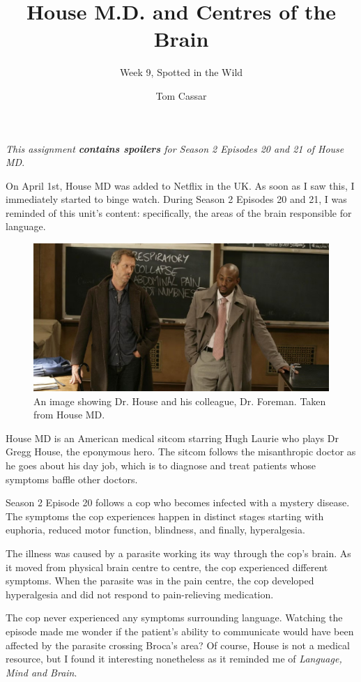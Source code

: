 \documentclass[fontsize=12]{article}
\title{House M.D. and Centres of the Brain}
\author{Week 9, Spotted in the Wild}
\date{Tom Cassar}
\begin{document}
\maketitle

\textit{This assignment \textbf{contains spoilers} for Season 2 Episodes 20 and 21 of 
House MD}. \linebreak


On April 1st, House MD was added to Netflix in the UK. As soon as I saw
this, I immediately started to binge watch. During Season 2
Episodes 20 and 21, I was reminded of this unit's content: specifically,
the areas of the brain responsible for language. \newline

\begin{figure}[H]
    \centering
    \includegraphics[width=0.8 \linewidth]{./img/house-foreman.png} 
    \caption{An image showing Dr. House and his colleague, Dr. Foreman. Taken
    from House MD.}
\end{figure}

House MD is an American medical sitcom starring Hugh Laurie who plays Dr
Gregg House, the eponymous hero. The sitcom follows the misanthropic doctor as
he goes about his day job, which is to diagnose and treat patients whose
symptoms baffle other doctors. \newline

Season 2 Episode 20 follows a cop who becomes infected with a mystery disease. The symptoms the cop experiences happen in distinct stages starting with euphoria, reduced motor function, blindness, and finally, hyperalgesia. \newline

The illness was caused by a parasite working its way through the
cop's brain. As it moved from physical brain centre to centre, the cop
experienced different symptoms. When the parasite was in the pain centre, the
cop developed hyperalgesia and did not respond to pain-relieving medication.

The cop never experienced any symptoms surrounding language. Watching the
episode made me wonder if the patient's ability to communicate would have
been affected by the parasite crossing Broca's area? Of course, House is 
not a medical resource, but I found it interesting nonetheless as it reminded 
me of \textit{Language, Mind and Brain}.
\end{document}
